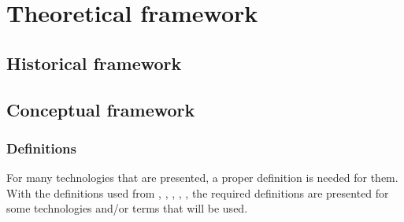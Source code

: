 \documentclass[preprint,12pt]{elsarticle}
\begin{document}
\newpage
\section{Theoretical framework}
	\subsection{Historical framework}
	\subsection{Conceptual framework}
		\subsubsection{Definitions}
		For many technologies that are presented, a proper definition is
		needed for them. With the definitions used from
		\citet*{AndroidOS}, \citet*{GoogleCardboard},
		\citet*{OculusRift}, \citet*{UnityEngine},
		\citet*{VirtualReality}, the required definitions are presented
		for some technologies and/or terms that will be used.
\end{document}
